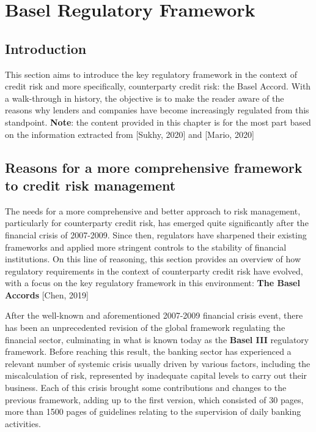 \documentclass[a4paper,12pt]{article}
\begin{document}
    \pagebreak
    \section{Basel Regulatory Framework}

    \subsection{Introduction}
    This section aims to introduce the key regulatory framework in the context of credit risk and more specifically, 
    counterparty credit risk: the Basel Accord. With a walk-through in history, 
    the objective is to make the reader aware of the reasons why lenders and companies have become increasingly regulated from this standpoint.
    \newline\newline
    \textbf{Note}: the content provided in this chapter is for the most part based on the information extracted from [Sukhy, 2020] and [Mario, 2020]

    \subsection{Reasons for a more comprehensive framework to credit risk management}
    
    The needs for a more comprehensive and better approach to risk management, 
    particularly for counterparty credit risk, has emerged quite significantly 
    after the financial crisis of 2007-2009. Since then, regulators have sharpened 
    their existing frameworks and applied more stringent controls to 
    the stability of financial institutions. On this line of reasoning, 
    this section provides an overview of how regulatory requirements in 
    the context of counterparty credit risk have evolved, with a focus on the 
    key regulatory framework in this environment: \textbf{The Basel Accords} [Chen, 2019]

    After the well-known and aforementioned 2007-2009 financial crisis event, 
    there has been an unprecedented revision of the global framework regulating 
    the financial sector, culminating in what is known today as the \textbf{Basel III} regulatory framework.
    Before reaching this result, the banking sector has experienced a 
    relevant number of systemic crisis usually driven by various factors, 
    including the miscalculation of risk, represented by inadequate capital levels 
    to carry out their business. Each of this crisis brought some contributions and 
    changes to the previous framework, adding up to the first version, 
    which consisted of 30 pages, more than 1500 pages of guidelines 
    relating to the supervision of daily banking activities. 
\end{document}
